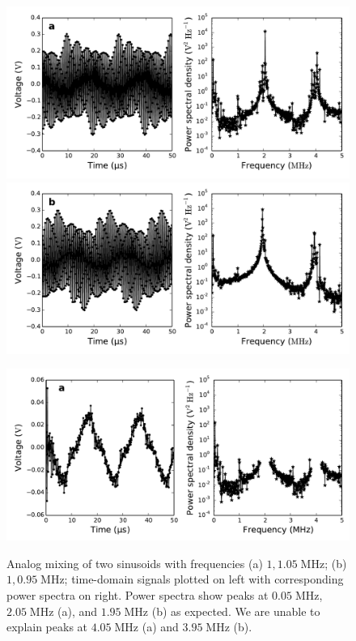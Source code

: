 \documentclass[11pt]{article}
\newcommand {\mt}{\mathrm}
\newcommand {\unit}[1]{\; \mt{#1}}
\begin{document}
\begin{figure}[!ht]
    \centering
    \includegraphics[scale=0.44]{scripts/analog_mixing_DSB_0.pdf} \\
    \includegraphics[scale=0.44]{scripts/analog_mixing_DSB_1.pdf} \\
    \caption{Analog mixing of two sinusoids with frequencies (a) $1, 1.05
    \unit{MHz}$; (b) $1, 0.95 \unit{MHz}$; time-domain signals plotted on left
    with corresponding power spectra on right.  Power spectra show peaks at
    $0.05 \unit{MHz}$, $2.05 \unit{MHz}$ (a), and $1.95 \unit{MHz}$ (b) as
    expected.  We are unable to explain peaks at $4.05 \unit{MHz}$ (a) and
    $3.95 \unit{MHz}$ (b).}
    \includegraphics[scale=0.44]{scripts/analog_mixing_DSB_filtered_0.pdf} \\

\end{figure}
\end{document}
